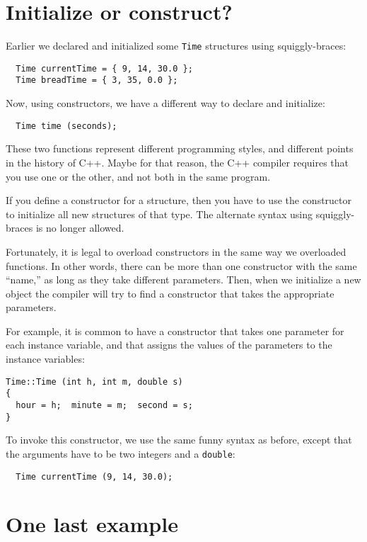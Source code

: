 \section {Initialize or construct?}

Earlier we declared and initialized some {\tt Time} structures
using squiggly-braces:

\begin{verbatim}
  Time currentTime = { 9, 14, 30.0 };
  Time breadTime = { 3, 35, 0.0 };
\end{verbatim}
%
Now, using constructors, we have a different way to declare
and initialize:

\begin{verbatim}
  Time time (seconds);
\end{verbatim}
%
These two functions represent different programming styles, and
different points in the history of C++.  Maybe
for that reason, the C++ compiler requires that you use one or
the other, and not both in the same program.

If you define a constructor for a structure, then you have to
use the constructor to initialize all new structures of that
type.  The alternate syntax using squiggly-braces is no longer
allowed.

Fortunately, it is legal to overload constructors in the same
way we overloaded functions.  In other words, there can be more
than one constructor with the same ``name,'' as long as they
take different parameters.  Then, when we initialize a new object
the compiler will try to find a constructor that takes the
appropriate parameters.

For example, it is common to have a constructor that takes
one parameter for each instance variable, and that assigns
the values of the parameters to the instance variables:

\begin{verbatim}
Time::Time (int h, int m, double s)
{
  hour = h;  minute = m;  second = s;
}
\end{verbatim}
%
To invoke this constructor, we use the same funny syntax
as before, except that the arguments have to be two integers
and a {\tt double}:

\begin{verbatim}
  Time currentTime (9, 14, 30.0);
\end{verbatim}

\section {One last example}

